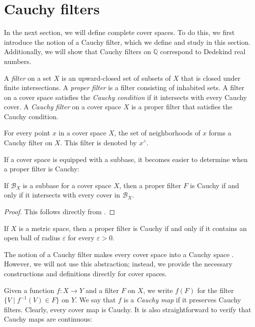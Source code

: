 \documentclass[reqno]{amsart}
\theoremstyle{definition}
\theoremstyle{remark}
\numberwithin{figure}{section}
\begin{document}
\section{Cauchy filters}
\label{sec:filters}

In the next section, we will define complete cover spaces.
To do this, we first introduce the notion of a Cauchy filter, which we define and study in this section.
Additionally, we will show that Cauchy filters on $\mathbb{Q}$ correspond to Dedekind real numbers.

\begin{defn}
A \emph{filter} on a set $X$ is an upward-closed set of subsets of $X$ that is closed under finite intersections.
A \emph{proper filter} is a filter consisting of inhabited sets.
A filter on a cover space satisfies the \emph{Cauchy condition} if it intersects with every Cauchy cover.
A \emph{Cauchy filter} on a cover space $X$ is a proper filter that satisfies the Cauchy condition.
\end{defn}

\begin{example}
For every point $x$ in a cover space $X$, the set of neighborhoods of $x$ forms a Cauchy filter on $X$.
This filter is denoted by $x^\wedge$.
\end{example}

If a cover space is equipped with a subbase, it becomes easier to determine when a proper filter is Cauchy:

\begin{prop}
If $\mathcal{B}_X$ is a subbase for a cover space $X$, then a proper filter $F$ is Cauchy if and only if it intersects with every cover in $\mathcal{B}_X$.
\end{prop}
\begin{proof}
This follows directly from .
\end{proof}

\begin{cor}
If $X$ is a metric space, then a proper filter is Cauchy if and only if it contains an open ball of radius $\varepsilon$ for every $\varepsilon > 0$.
\end{cor}

The notion of a Cauchy filter makes every cover space into a Cauchy space \cite[Definition~1.3.1]{cauchy-spaces}.
However, we will not use this abstraction; instead, we provide the necessary constructions and definitions directly for cover spaces.

Given a function $f : X \to Y$ and a filter $F$ on $X$, we write $f(F)$ for the filter $\{ V \mid f^{-1}(V) \in F \}$ on $Y$.
We say that $f$ is a \emph{Cauchy map} if it preserves Cauchy filters.
Clearly, every cover map is Cauchy.
It is also straightforward to verify that Cauchy maps are continuous:
\end{document}
